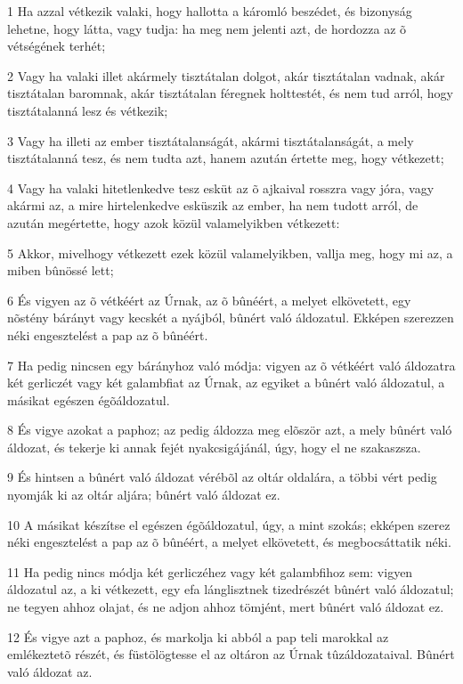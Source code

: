 \par 1 Ha azzal vétkezik valaki, hogy hallotta a káromló beszédet, és bizonyság lehetne, hogy látta, vagy tudja: ha meg nem jelenti azt, de hordozza az õ vétségének terhét;
\par 2 Vagy ha valaki illet akármely tisztátalan dolgot, akár tisztátalan vadnak, akár tisztátalan baromnak, akár tisztátalan féregnek holttestét, és nem tud arról, hogy tisztátalanná lesz és vétkezik;
\par 3 Vagy ha illeti az ember tisztátalanságát, akármi tisztátalanságát, a mely tisztátalanná tesz, és nem tudta azt, hanem azután értette meg, hogy vétkezett;
\par 4 Vagy ha valaki hitetlenkedve tesz esküt az õ ajkaival rosszra vagy jóra, vagy akármi az, a mire hirtelenkedve esküszik az ember, ha nem tudott arról, de azután megértette, hogy azok közül valamelyikben vétkezett:
\par 5 Akkor, mivelhogy vétkezett ezek közül valamelyikben, vallja meg, hogy mi az, a miben bûnössé lett;
\par 6 És vigyen az õ vétkéért az Úrnak, az õ bûnéért, a melyet elkövetett, egy nõstény bárányt vagy kecskét a nyájból, bûnért való áldozatul. Ekképen szerezzen néki engesztelést a pap az õ bûnéért.
\par 7 Ha pedig nincsen egy bárányhoz való módja: vigyen az õ vétkéért való áldozatra két gerliczét vagy két galambfiat az Úrnak, az egyiket a bûnért való áldozatul, a másikat egészen égõáldozatul.
\par 8 És vigye azokat a paphoz; az pedig áldozza meg elõször azt, a mely bûnért való áldozat, és tekerje ki annak fejét nyakcsigájánál, úgy, hogy el ne szakaszsza.
\par 9 És hintsen a bûnért való áldozat vérébõl az oltár oldalára, a többi vért pedig nyomják ki az oltár aljára; bûnért való áldozat ez.
\par 10 A másikat készítse el egészen égõáldozatul, úgy, a mint szokás; ekképen szerez néki engesztelést a pap az õ bûnéért, a melyet elkövetett, és megbocsáttatik néki.
\par 11 Ha pedig nincs módja két gerliczéhez vagy két galambfihoz sem: vigyen áldozatul az, a ki vétkezett, egy efa lánglisztnek tizedrészét bûnért való áldozatul; ne tegyen ahhoz olajat, és ne adjon ahhoz tömjént, mert bûnért való áldozat ez.
\par 12 És vigye azt a paphoz, és markolja ki abból a pap teli marokkal az emlékeztetõ részét, és füstölögtesse el az oltáron az Úrnak tûzáldozataival. Bûnért való áldozat az.
